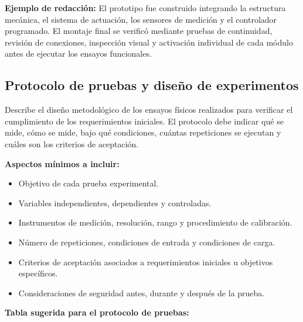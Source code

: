 \documentclass[12pt,letterpaper]{report}
\begin{document}
\begin{instrucciones}
\noindent \textbf{Ejemplo de redacción:} El prototipo fue construido integrando la estructura mecánica, el sistema de actuación, los sensores de medición y el controlador programado. El montaje final se verificó mediante pruebas de continuidad, revisión de conexiones, inspección visual y activación individual de cada módulo antes de ejecutar los ensayos funcionales.
\end{instrucciones}

\subsection{Protocolo de pruebas y diseño de experimentos}

\begin{instrucciones}
Describe el diseño metodológico de los ensayos físicos realizados para verificar el cumplimiento de los requerimientos iniciales. El protocolo debe indicar qué se mide, cómo se mide, bajo qué condiciones, cuántas repeticiones se ejecutan y cuáles son los criterios de aceptación.

\vspace{2mm}
\noindent \textbf{Aspectos mínimos a incluir:}
\begin{itemize}
  \item Objetivo de cada prueba experimental.
  \item Variables independientes, dependientes y controladas.
  \item Instrumentos de medición, resolución, rango y procedimiento de calibración.
  \item Número de repeticiones, condiciones de entrada y condiciones de carga.
  \item Criterios de aceptación asociados a requerimientos iniciales u objetivos específicos.
  \item Consideraciones de seguridad antes, durante y después de la prueba.
\end{itemize}

\vspace{2mm}
\noindent \textbf{Tabla sugerida para el protocolo de pruebas:}


\end{instrucciones}
\end{document}
